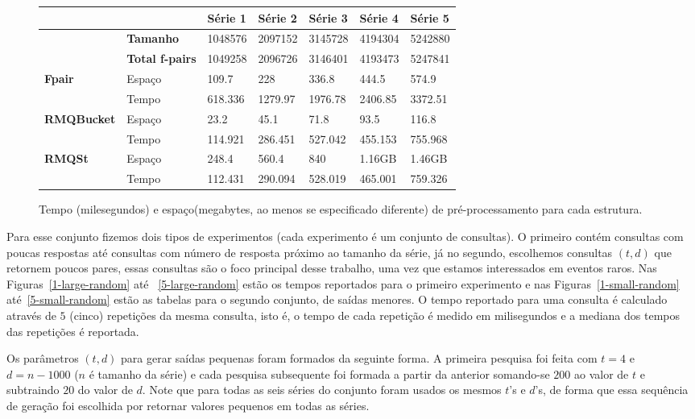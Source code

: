 \documentclass[12pt]{article}
\begin{document}
\begin{figure}
\begin{center}
\begin{tabular}{|l|l|l|l|l|l|l|}
\hline
      &    & Série 1 & Série 2 & Série 3 & Série 4 & Série 5 \\
\hline
			& \textbf{Tamanho}  & 1048576 & 2097152  & 3145728  & 4194304  & 5242880 \\
\hline
			& \textbf{Total f-pairs}  & 1049258 & 2096726   & 3146401  & 4193473  & 5247841 \\
\hline
\multirow{2}{*}{\textbf{Fpair}} & Espaço & 109.7 & 228 & 336.8 & 444.5 & 574.9\\
                                & Tempo & 618.336 & 1279.97 & 1976.78 & 2406.85 & 3372.51\\
\hline
\multirow{2}{*}{\textbf{RMQBucket}} & Espaço & 23.2 & 45.1 & 71.8 & 93.5 & 116.8\\
													          & Tempo & 114.921 & 286.451 & 527.042 & 455.153 & 755.968\\
\hline
\multirow{2}{*}{\textbf{RMQSt}} & Espaço & 248.4 & 560.4 & 840 & 1.16GB & 1.46GB \\
											          & Tempo & 112.431 & 290.094 & 528.019 & 465.001 & 759.326\\
\hline
\end{tabular}
\caption{Tempo (milesegundos) e espaço(megabytes, ao menos se especificado diferente) de pré-processamento para cada estrutura.}
\label{pre-random}
\end{center}
\end{figure}



Para esse conjunto fizemos dois tipos de experimentos (cada experimento é um conjunto de consultas).
O primeiro contém consultas com poucas respostas até consultas com número de resposta próximo
ao tamanho da série, já no segundo,  escolhemos consultas $(t, d)$ que retornem poucos pares, essas
consultas são o foco principal desse trabalho, uma vez que estamos interessados
em eventos raros. Nas Figuras~\ref{1-large-random} até ~\ref{5-large-random} estão
os tempos reportados para o primeiro experimento e nas Figuras~\ref{1-small-random} até~\ref{5-small-random}
estão as tabelas para o segundo conjunto, de saídas menores. 
O tempo reportado para uma consulta é calculado através de $5$ (cinco) repetições da mesma
consulta, isto é, o tempo de cada repetição é medido em milisegundos e a mediana dos tempos
das repetições é reportada.

Os parâmetros $(t, d)$ para gerar saídas pequenas foram formados da seguinte forma. A primeira pesquisa
foi feita com $t = 4$ e $d = n - 1000$ ($n$ é tamanho da série) e cada pesquisa subsequente foi formada a partir da anterior somando-se
$200$ ao valor de $t$ e subtraindo $20$ do valor de $d$. Note que para todas as seis séries do conjunto foram usados os mesmos
$t$'s e $d$'s, de forma que essa sequência de geração foi escolhida por retornar valores pequenos em todas as séries.
\end{document}
